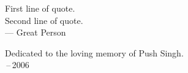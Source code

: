 \thispagestyle{empty}
{}

\vspace*{3cm}

\begin{center}
    First line of quote. \\
    Second line of quote. \\ \medskip
    --- Great Person
\end{center}

\medskip

\begin{center}
    Dedicated to the loving memory of Push Singh. \\ \,--\,2006
\end{center}
